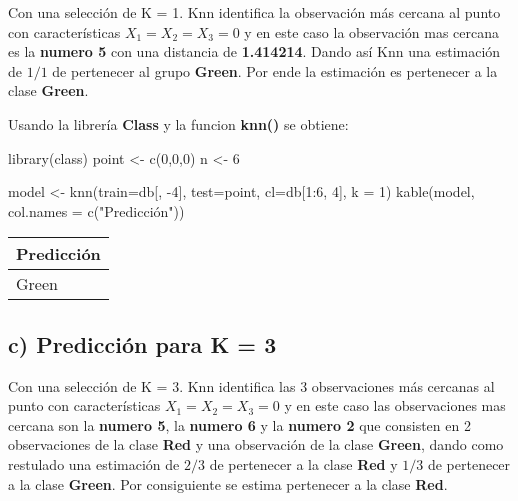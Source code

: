 \documentclass[
  12pt,
  letterpaper,
]{article}
\newenvironment{Shaded}{\begin{snugshade}}{\end{snugshade}}
\newcommand{\AttributeTok}[1]{\textcolor[rgb]{0.77,0.63,0.00}{#1}}
\newcommand{\DecValTok}[1]{\textcolor[rgb]{0.00,0.00,0.81}{#1}}
\newcommand{\FunctionTok}[1]{\textcolor[rgb]{0.00,0.00,0.00}{#1}}
\newcommand{\NormalTok}[1]{#1}
\newcommand{\OtherTok}[1]{\textcolor[rgb]{0.56,0.35,0.01}{#1}}
\newcommand{\SpecialCharTok}[1]{\textcolor[rgb]{0.00,0.00,0.00}{#1}}
\newcommand{\StringTok}[1]{\textcolor[rgb]{0.31,0.60,0.02}{#1}}
\begin{document}
Con una selección de K = 1. Knn identifica la observación más cercana al
punto con características \(X_1 = X_2 = X_3 = 0\) y en este caso la
observación mas cercana es la \textbf{numero 5} con una distancia de
\textbf{1.414214}. Dando así Knn una estimación de \(1/1\) de pertenecer
al grupo \textbf{Green}. Por ende la estimación es pertenecer a la clase
\textbf{Green}.

Usando la librería \textbf{Class} y la funcion \textbf{knn()} se
obtiene:

\begin{Shaded}
\begin{Highlighting}[]
\FunctionTok{library}\NormalTok{(class)}
\NormalTok{point }\OtherTok{\textless{}{-}} \FunctionTok{c}\NormalTok{(}\DecValTok{0}\NormalTok{,}\DecValTok{0}\NormalTok{,}\DecValTok{0}\NormalTok{)}
\NormalTok{n }\OtherTok{\textless{}{-}} \DecValTok{6} 

\NormalTok{model }\OtherTok{\textless{}{-}} \FunctionTok{knn}\NormalTok{(}\AttributeTok{train=}\NormalTok{db[, }\SpecialCharTok{{-}}\DecValTok{4}\NormalTok{], }\AttributeTok{test=}\NormalTok{point, }\AttributeTok{cl=}\NormalTok{db[}\DecValTok{1}\SpecialCharTok{:}\DecValTok{6}\NormalTok{, }\DecValTok{4}\NormalTok{], }\AttributeTok{k =} \DecValTok{1}\NormalTok{)}
\FunctionTok{kable}\NormalTok{(model, }\AttributeTok{col.names =} \FunctionTok{c}\NormalTok{(}\StringTok{"Predicción"}\NormalTok{))}
\end{Highlighting}
\end{Shaded}

\begin{tabular}{l}
\hline
Predicción\\
\hline
Green\\
\hline
\end{tabular}

\subsection{c) Predicción para K = 3}

Con una selección de K = 3. Knn identifica las 3 observaciones más
cercanas al punto con características \(X_1 = X_2 = X_3 = 0\) y en este
caso las observaciones mas cercana son la \textbf{numero 5}, la
\textbf{numero 6} y la \textbf{numero 2} que consisten en 2
observaciones de la clase \textbf{Red} y una observación de la clase
\textbf{Green}, dando como restulado una estimación de \(2/3\) de
pertenecer a la clase \textbf{Red} y \(1/3\) de pertenecer a la clase
\textbf{Green}. Por consiguiente se estima pertenecer a la clase
\textbf{Red}.
\end{document}
